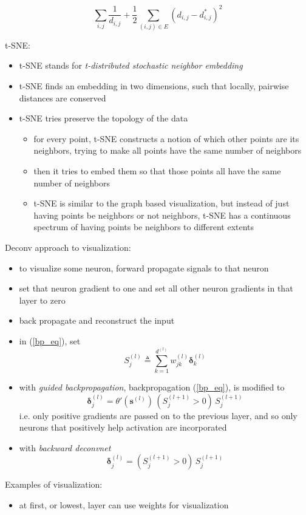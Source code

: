 \documentclass[onecolumn]{IEEEtran}
\newcommand{\beq}{\begin{equation}}
\newcommand{\eeq}{\end{equation}}
\newcommand{\bi}{\begin{itemize}}
\newcommand{\ei}{\end{itemize}}
\begin{document}
\begin{itemize}
        \beq
             \sum_{i,j} \frac{1}{d_{i,j}} + \frac{1}{2}\sum_{(i,j)\in E} (d_{i,j}- d_{i,j}^*)^2
        \eeq
    \ei
    \item t-SNE:
    \bi
        \item t-SNE stands for \emph{t-distributed stochastic neighbor embedding}
        \item t-SNE finds an embedding in two dimensions, such that locally, pairwise distances are conserved
        \item t-SNE tries preserve the topology of the data
        \bi
            \item for every point, t-SNE constructs a notion of which other points are its neighbors, trying to make all points have the same number of neighbors
            \item then it tries to embed them so that those points all have the same number of neighbors
            \item t-SNE is similar to the graph based visualization, but instead of just having points be neighbors or not neighbors, t-SNE has a continuous spectrum of having points be neighbors to different extents
        \ei
    \ei
    \item Deconv approach to visualization:
    \bi
        \item to visualize some neuron, forward propagate signals to that neuron
        \item set that neuron gradient to one and set all other neuron gradients in that layer to zero
        \item back propagate and reconstruct the input
        \item in (\ref{bp_eq}), set
        \beq
             S^{(l)}_j \triangleq  \sum_{k=1}^{d^{(l)}} w_{jk}^{(l)}\bm{\delta}_k^{(l)}
        \eeq
        \item with \emph{guided backpropagation}, backpropagation (\ref{bp_eq}), is modified to
        \beq
             \bm{\delta}^{(l)}_j =  \theta'(\bm{s}^{(l)}) \, (S^{(l+1)}_j > 0) \, S^{(l+1)}_j
        \eeq
        i.e. only positive gradients are passed on to the previous layer, and so only neurons that positively help activation are incorporated
        \item with \emph{backward deconvnet}
        \beq
             \bm{\delta}^{(l)}_j =  (S^{(l+1)}_j > 0) \, S^{(l+1)}_j
        \eeq
    \ei
     \item Examples of visualization:
    \bi
        \item at first, or lowest, layer can use weights for visualization

\end{itemize}
\end{document}
